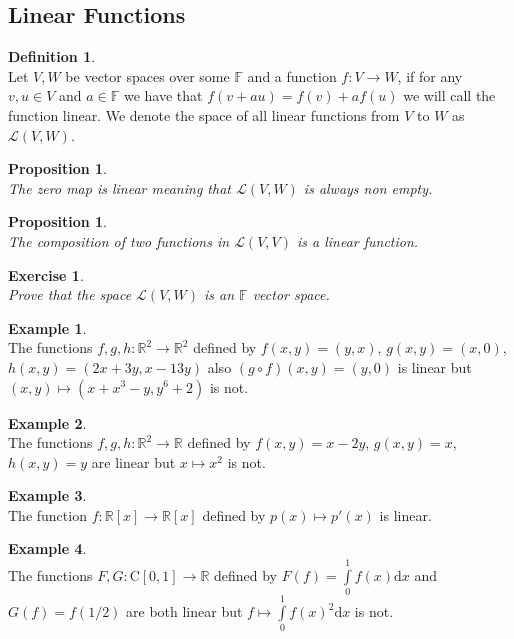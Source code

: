 \documentclass[12pt]{article}
\newtheorem{prop}[theorem]{Proposition}
\theoremstyle{definition}
\newtheorem{definition}[theorem]{Definition}
\newtheorem*{example}{Example}
\theoremstyle{remark}
\theoremstyle{plain}
\newtheorem{ex}[subsubsection]{Exercise}
\begin{document}
\subsection{Linear Functions}
\begin{definition}\leavevmode \\
     Let $V,W$ be vector spaces over some $\mathbb{F}$ and a function $f:V\to W$, if for any $v,u \in V$ and $a\in \mathbb{F}$ we have that $f(v+au)=f(v)+af(u)$ we will call the function linear. We denote the space of all linear functions from $V$ to $W$ as $\mathcal{L}(V,W)$.
\end{definition}
\begin{prop}\leavevmode \\
    The zero map is linear meaning that $\mathcal{L}(V,W)$ is always non empty.
\end{prop}
\begin{prop}\leavevmode \\
    The composition of two functions in $\mathcal{L}(V,V)$ is a linear function.
\end{prop}
\begin{ex}\leavevmode \\
    Prove that the space $\mathcal{L}(V,W)$ is an $\mathbb{F}$ vector space.
\end{ex}
\begin{example}\leavevmode \\
    The functions $f,g,h:\mathbb{R}^2\to \mathbb{R}^2$ defined by $f(x,y)=(y,x)$, $g(x,y)=(x,0)$, $h(x,y)=(2x+3y,x-13y)$ also $(g\circ f)(x,y)=(y,0)$ is linear  but $(x,y)\mapsto (x+x^3-y,y^6+2)$ is not.
\end{example}
\begin{example}\leavevmode \\
    The functions $f,g,h:\mathbb{R}^2\to \mathbb{R}$ defined by $f(x,y)=x-2y$, $g(x,y)=x$, $h(x,y)=y$ are linear but $x\mapsto x^2$ is not.
\end{example}
\begin{example}\leavevmode \\
    The function $f:\mathbb{R}[x]\to \mathbb{R}[x]$ defined by $p(x) \mapsto p'(x)$ is linear.
\end{example}
\begin{example}\leavevmode \\
    The functions $F,G:\mathrm{C}[0,1]\to \mathbb{R}$ defined by $F(f)=\int\limits_0^1 f(x) \mathrm{d}x$ and $G(f)=f(1/2)$ are both linear but $f\mapsto \int\limits_0^1 f(x)^2 \mathrm{d}x$ is not.
\end{example}
\end{document}
